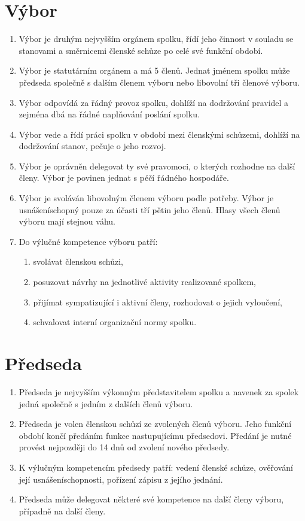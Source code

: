 \documentclass[11pt]{article}
\begin{document}
\section{Výbor}
\begin{enumerate}
\item Výbor je druhým nejvyšším orgánem spolku, řídí jeho činnost v souladu se stanovami a směrnicemi členské schůze po celé své funkční období. 
\item Výbor je statutárním orgánem a má 5 členů. Jednat jménem spolku může předseda společně s dalším členem výboru nebo libovolní tři členové výboru.
\item Výbor odpovídá za řádný provoz spolku, dohlíží na dodržování pravidel a zejména dbá na řádné naplňování poslání spolku.
\item Výbor vede a řídí práci spolku v období mezi členskými schůzemi, dohlíží na dodržování stanov, pečuje o jeho rozvoj.
\item Výbor je oprávněn delegovat ty své pravomoci, o kterých rozhodne na další členy. Výbor je povinen jednat s péčí řádného hospodáře. 
\item Výbor je svoláván libovolným členem výboru podle potřeby. Výbor je usnášeníschopný pouze za účasti tří pětin jeho členů. Hlasy všech členů výboru mají stejnou váhu.
\item Do výlučné kompetence výboru patří: 
\begin{enumerate}
\item svolávat členskou schůzi, 
\item posuzovat návrhy na jednotlivé aktivity realizované spolkem,
\item přijímat sympatizující i aktivní členy, rozhodovat o jejich vyloučení,
\item schvalovat interní organizační normy spolku.
\end{enumerate}
\end{enumerate}

\section{Předseda}
\begin{enumerate}
\item Předseda je nejvyšším výkonným představitelem spolku a navenek za spolek jedná společně s jedním z dalších členů výboru.  
\item Předseda je volen členskou schůzí ze zvolených členů výboru. Jeho funkční období končí předáním funkce nastupujícímu předsedovi. Předání je nutné provést nejpozději do 14 dnů od zvolení nového předsedy. 
\item K výlučným kompetencím předsedy patří: vedení členské schůze, ověřování její usnášeníschopnosti, pořízení zápisu z jejího jednání.
\item Předseda může delegovat některé své kompetence na další členy výboru, případně na další členy.
\end{enumerate}
\end{document}
